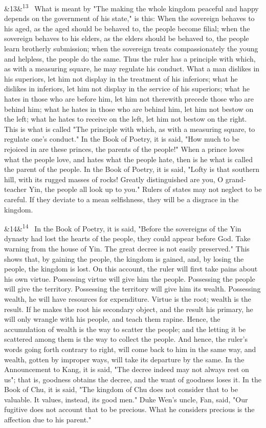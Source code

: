 \documentclass[12pt]{article}
\newcommand{\para}[1][]{\par\noindent\ifx&#1&\else\textsuperscript{\footnotesize #1}~\fi}
\begin{document}
\para[13] What is meant by "The making the whole kingdom peaceful and happy depends on the government of his state," is this: When the sovereign behaves to his aged, as the aged should be behaved to, the people become filial; when the sovereign behaves to his elders, as the elders should be behaved to, the people learn brotherly submission; when the sovereign treats compassionately the young and helpless, the people do the same. Thus the ruler has a principle with which, as with a measuring square, he may regulate his conduct. What a man dislikes in his superiors, let him not display in the treatment of his inferiors; what he dislikes in inferiors, let him not display in the service of his superiors; what he hates in those who are before him, let him not therewith precede those who are behind him; what he hates in those who are behind him, let him not bestow on the left; what he hates to receive on the left, let him not bestow on the right. This is what is called "The principle with which, as with a measuring square, to regulate one's conduct." In the Book of Poetry, it is said, "How much to be rejoiced in are these princes, the parents of the people!" When a prince loves what the people love, and hates what the people hate, then is he what is called the parent of the people. In the Book of Poetry, it is said, "Lofty is that southern hill, with its rugged masses of rocks! Greatly distinguished are you, O grand-teacher Yin, the people all look up to you." Rulers of states may not neglect to be careful. If they deviate to a mean selfishness, they will be a disgrace in the kingdom.

\para[14] In the Book of Poetry, it is said, "Before the sovereigns of the Yin dynasty had lost the hearts of the people, they could appear before God. Take warning from the house of Yin. The great decree is not easily preserved." This shows that, by gaining the people, the kingdom is gained, and, by losing the people, the kingdom is lost. On this account, the ruler will first take pains about his own virtue. Possessing virtue will give him the people. Possessing the people will give the territory. Possessing the territory will give him its wealth. Possessing wealth, he will have resources for expenditure. Virtue is the root; wealth is the result. If he makes the root his secondary object, and the result his primary, he will only wrangle with his people, and teach them rapine. Hence, the accumulation of wealth is the way to scatter the people; and the letting it be scattered among them is the way to collect the people. And hence, the ruler's words going forth contrary to right, will come back to him in the same way, and wealth, gotten by improper ways, will take its departure by the same. In the Announcement to Kang, it is said, "The decree indeed may not always rest on us"; that is, goodness obtains the decree, and the want of goodness loses it. In the Book of Chu, it is said, "The kingdom of Chu does not consider that to be valuable. It values, instead, its good men." Duke Wen's uncle, Fan, said, "Our fugitive does not account that to be precious. What he considers precious is the affection due to his parent."
\end{document}
